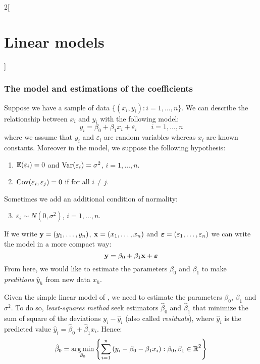 \documentclass[../../../main_math.tex]{subfiles}
\begin{document}
\begin{multicols}{2}[\section{Linear models}]
  \subsubsection{The model and estimations of the coefficients}
  \begin{definition}
    Suppose we have a sample of data $\{(x_i,y_i):i=1,\ldots,n\}$. We can describe the relationship between $x_i$ and $y_i$ with the following model:
    $$y_i=\beta_0+\beta_1x_i+\varepsilon_i\qquad i=1,\ldots,n$$
    where we assume that $y_i$ and $\varepsilon_i$ are random variables whereas $x_i$ are known constants. Moreover in the model, we suppose the following hypothesis:
    \begin{enumerate}
      \item $\mathbb{E}(\varepsilon_i)=0$ and $\mathrm{Var}(\varepsilon_i)=\sigma^2$, $i=1,\ldots,n$.
      \item $\mathrm{Cov}(\varepsilon_i,\varepsilon_j)=0$ if for all $i\ne j$.
    \end{enumerate}
    Sometimes we add an additional condition of normality:
    \begin{enumerate}\setcounter{enumii}{2}
      \item $\varepsilon_i\sim N(0,\sigma^2)$, $i=1,\ldots,n$.
    \end{enumerate}
    If we write $\boldsymbol{\mathrm{y}}=(y_1,\ldots,y_n)$, $\boldsymbol{\mathrm{x}}=(x_1,\ldots,x_n)$ and $\boldsymbol{\mathrm{\varepsilon}}=(\varepsilon_1,\ldots,\varepsilon_n)$ we can write the model in a more compact way:
    \begin{equation}\label{LM:simple}
      \boldsymbol{\mathrm{y}}=\beta_0+\beta_1\boldsymbol{\mathrm{x}}+\boldsymbol{\mathrm{\varepsilon}}
    \end{equation}
    From here, we would like to estimate the parameters $\beta_0$ and $\beta_1$ to make \emph{preditions} $\hat{y}_h$ from new data $x_h$.
  \end{definition}
  \begin{proposition}
    Given the simple linear model of , we need to estimate the parameters $\beta_0$, $\beta_1$ and $\sigma^2$. To do so, \emph{least-squares method} seek estimators $\hat\beta_0$ and $\hat\beta_1$ that minimize the sum of square of the deviations $y_i-\hat{y}_i$ (also called \emph{residuals}), where $\hat{y}_i$ is the predicted value $\hat{y}_i=\hat\beta_0+\hat\beta_1 x_i$. Hence:
    \begin{align*}
      \hat\beta_0 & =\argmin_{\beta_0}\left\{\sum_{i=1}^n{(y_i-\beta_0-\beta_1x_i):\beta_0,\beta_1\in\RR}^2\right\} \\

\end{align*}
\end{proposition}
\end{multicols}
\end{document}
